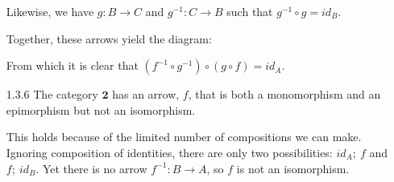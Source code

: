 \documentclass{article}
\begin{document}
\begin{enumerate}
  Likewise, we have $g : B \rightarrow C$ and $g^{-1} : C \rightarrow B$ such that $g^{-1} \circ g = id_B$.
  \begin{center}
  \end{center}

  Together, these arrows yield the diagram:
  \begin{center}
  \end{center}

  From which it is clear that $(f^{-1} \circ g^{-1}) \circ (g \circ f) = id_A$.

\item[]
\item[1.3.6] The category $\textbf{2}$ has an arrow, $f$, that is both a monomorphism and an epimorphism but not an isomorphism. 
  \begin{center}
  \end{center}
  This holds because of the limited number of compositions we can make. 
  Ignoring composition of identities, there are only two possibilities: $id_A;\ f$ and $f;\ id_B$. 
  Yet there is no arrow $f^{-1}: B \rightarrow A$, so $f$ is not an isomorphism.
\end{enumerate}
\end{document}

